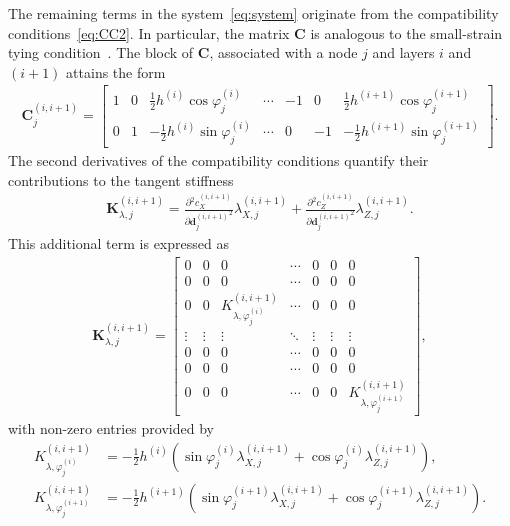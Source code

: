 \documentclass[11pt]{article}
\newcommand{\M}[1]{{\boldsymbol #1}}
\newcommand{\lay}[1]{^{(#1)}}
\newcommand{\rot}[1]{\varphi\lay{#1}}
\newcommand{\h}[1]{h\lay{#1}}
\newcommand{\half}{\mbox{$\frac{1}{2}$}}
\newcommand{\del}[2]{\mbox{$\displaystyle\frac{#1}{#2}$}}
\newcommand{\ppd}[2]{\del{\partial {#1}}{\partial{#2}}}
\newcommand{\Md}{\M{d}}
\begin{document}
The remaining terms in the system~\eqref{eq:system} originate from the
compatibility conditions~\eqref{eq:CC2}. In
particular, the matrix $\M{C}$ is analogous to the small-strain tying
condition~\cite[Section~4]{Zemanova:2008:SNM}. The block of $\M{C}$,
associated with a node $j$ and layers $i$ and $(i+1)$ attains the form
\begin{eqnarray}
\M{C}\lay{i,i+1}_{j} 
= 
\begin{bmatrix}
  1 & 0 & \half \h{i}\cos \rot{i}_j & \cdots & 
 -1 & 0 & \half \h{i+1} \cos \rot{i+1}_j \\ 
  0 & 1 &-\half \h{i} \sin \rot{i}_j & \cdots &  
  0 &-1 &-\half \h{i+1} \sin \rot{i+1}_j
\end{bmatrix}.
\end{eqnarray}
The second derivatives of the compatibility conditions quantify their
contributions to the tangent stiffness
\begin{eqnarray}
\M{K}_{\lambda, j} \lay{i,i+1} 
=
\ppd{^2 c_X\lay{i,i+1}}{{\Md\lay{i,i+1}_{j}}^2} \lambda_{X,j}\lay{i,i+1} + 
\ppd{^2 c_Z\lay{i,i+1}}{{\Md\lay{i,i+1}_{j}}^2} \lambda_{Z,j}\lay{i,i+1}.
\end{eqnarray}
This additional term is expressed as
\begin{eqnarray}
\M{K}_{\lambda, j} \lay{i,i+1} = 
\begin{bmatrix}
  0 & 0 & 0 & \cdots & 0 & 0 & 0 \\
  0 & 0 & 0 & \cdots & 0 & 0 & 0 \\
  0 & 0 & 
  K_{\lambda, \rot{i}_j} \lay{i,i+1}
            & \cdots & 0 & 0 & 0 \\
  \vdots & \vdots & \vdots & \ddots & \vdots & \vdots & \vdots \\
  0 & 0 & 0 & \cdots & 0 & 0 & 0 \\
  0 & 0 & 0 & \cdots & 0 & 0 & 0 \\
  0 & 0 & 0 & \cdots & 0 & 0 & 
  K_{\lambda, \rot{i+1}_j} \lay{i,i+1}
\end{bmatrix},
\end{eqnarray}
with non-zero entries provided by
\begin{subequations}
\begin{align}
K_{\lambda, \rot{i}_j}\lay{i,i+1} 
& = 
-\half \h{i} ( \sin\rot{i}_j \lambda_{X,j}\lay{i,i+1}
+ \cos\rot{i}_j \lambda_{Z,j}\lay{i,i+1} ),
\\
K_{\lambda, \rot{i+1}_j}\lay{i,i+1} 
& = 
-\half \h{i+1} (  \sin\rot{i+1}_j \lambda_{X,j}\lay{i,i+1}
+ \cos\rot{i+1}_j \lambda_{Z,j}\lay{i,i+1} ).
\end{align}
\end{subequations}
\end{document}
